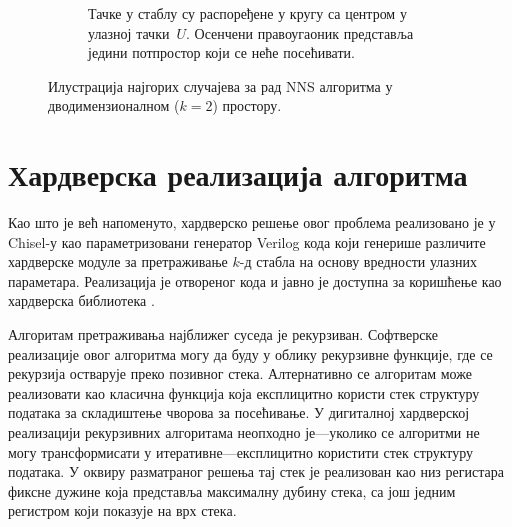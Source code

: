\documentclass[master]{finthesis}
\newcommand*{\kd}{\texorpdfstring{$k$}{k}-д }
\begin{document}
\begin{figure}[ht]
\begin{subfigure}[t]{0.48\linewidth}
        \caption{Тачке у стаблу су распоређене у кругу са центром у улазној тачки~$U$. Осенчени правоугаоник представља једини потпростор који се неће посећивати.}
        \label{fig:worstcase:center}
    \end{subfigure}

    \caption{Илустрација најгорих случајева за рад NNS алгоритма у дводимензионалном ($k = 2$) простору.}
    \label{fig:worstcase}
\end{figure}

\section{Хардверска реализација алгоритма}

Као што је већ напоменуто, хардверско решење овог проблема реализовано је у Chisel-у као параметризовани генератор Verilog кода који генерише различите хардверске модуле за претраживање \kd стабла на основу вредности улазних параметара. Реализација је отвореног кода и јавно је доступна за коришћење као хардверска библиотека \cite{kondic2022hardware}.

Алгоритам претраживања најближег суседа је рекурзиван. Софтверске реализације овог алгоритма могу да буду у облику рекурзивне функције, где се рекурзија остварује преко позивног стека. Алтернативно се алгоритам може реализовати као класична функција која експлицитно користи стек структуру података за складиштење чворова за посећивање. У дигиталној хардверској реализацији рекурзивних алгоритама неопходно је---уколико се алгоритми не могу трансформисати у итеративне---експлицитно користити стек структуру података. У оквиру разматраног решења тај стек је реализован као низ регистара фиксне дужине која представља максималну дубину стека, са још једним регистром који показује на врх стека.
\end{document}
